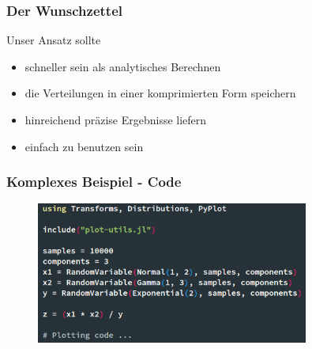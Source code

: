 \documentclass[11pt]{beamer}
\begin{document}
\begin{frame}
  \frametitle{Der Wunschzettel}
  Unser Ansatz sollte
  \begin{itemize}
  \item schneller sein als analytisches Berechnen
  \item die Verteilungen in einer komprimierten Form speichern
  \item hinreichend präzise Ergebnisse liefern
  \item einfach zu benutzen sein
  \end{itemize}
\end{frame}

\begin{frame}
  \frametitle{Komplexes Beispiel - Code}
  \begin{figure}
    \includegraphics[width=0.8\textwidth]{presentation/code}
  \end{figure}
\end{frame}
\end{document}
